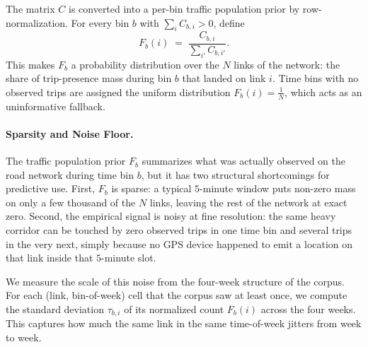 \documentclass[sigconf, review]{acmart}
\newcommand{\NF}{\tau}
\newcommand{\hamid}[1]{{\color{blue}\textbf{HAMID:}\ #1}}
\newcommand{\jeff}[1]{{\color{red}\textbf{JEFF:}\ #1}}
\begin{document}
The matrix $C$ is converted into a per-bin
traffic population prior by row-normalization. For every bin $b$ with
$\sum_i C_{b, i} > 0$, define
\[
F_b(i) \;=\; \frac{C_{b, i}}{\sum_{i'} C_{b, i'}}.
\]
This makes $F_b$ a probability distribution over the $N$ links of
the network: the share of trip-presence mass during bin $b$ that
landed on link $i$. Time bins with no observed trips are assigned the
uniform distribution $F_b(i) = \frac{1}{N}$, which acts as an
uninformative fallback.


\paragraph{Sparsity and Noise Floor.}
The traffic population prior $F_b$ summarizes what was actually observed
on the road network during time bin $b$, but it has two structural
shortcomings for predictive use. First, $F_b$ is sparse: a typical
$5$-minute window puts non-zero mass on only a few thousand of the
$N$ links, leaving the rest of the network at exact zero. Second, the empirical signal is noisy at fine
resolution: the same heavy corridor can be touched by zero observed
trips in one time bin and several trips in the very next, simply because
no GPS device happened to emit a location on that link inside that
$5$-minute slot.  

We measure the scale of this noise from the four-week structure
of the corpus. For each (link, bin-of-week) cell that the corpus
saw at least once, we compute the standard deviation  $\NF_{b, i}$ of its
normalized count $F_b(i)$ across the
four weeks.  
This captures how much the same link in the same
time-of-week jitters from week to week. 


\end{document}
